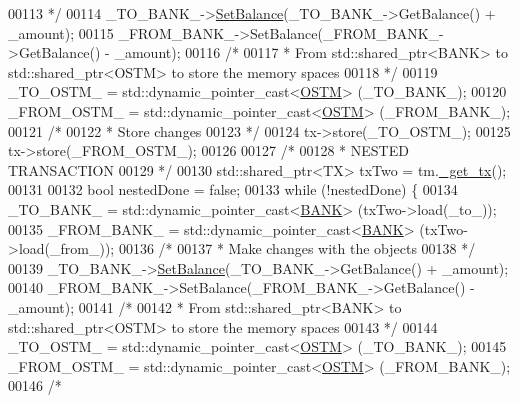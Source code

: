 \begin{DoxyCode}
00113 \textcolor{comment}{             */}
00114             \_TO\_BANK\_->\hyperlink{class_b_a_n_k_ae3e45b407bf8ec7175662442ea24b7c0_ae3e45b407bf8ec7175662442ea24b7c0}{SetBalance}(\_TO\_BANK\_->GetBalance() + \_amount);
00115             \_FROM\_BANK\_->SetBalance(\_FROM\_BANK\_->GetBalance() - \_amount);
00116             \textcolor{comment}{/*}
00117 \textcolor{comment}{             * From std::shared\_ptr<BANK> to std::shared\_ptr<OSTM> to store the memory spaces}
00118 \textcolor{comment}{             */}
00119             \_TO\_OSTM\_ = std::dynamic\_pointer\_cast<\hyperlink{class_o_s_t_m}{OSTM}> (\_TO\_BANK\_);
00120             \_FROM\_OSTM\_ = std::dynamic\_pointer\_cast<\hyperlink{class_o_s_t_m}{OSTM}> (\_FROM\_BANK\_);
00121             \textcolor{comment}{/*}
00122 \textcolor{comment}{             * Store changes}
00123 \textcolor{comment}{             */}
00124             tx->store(\_TO\_OSTM\_);
00125             tx->store(\_FROM\_OSTM\_);
00126 
00127             \textcolor{comment}{/*}
00128 \textcolor{comment}{             * NESTED TRANSACTION}
00129 \textcolor{comment}{             */}
00130             std::shared\_ptr<TX> txTwo = tm.\hyperlink{class_t_m_a41cb0226cc4080c931651b13f74a0075_a41cb0226cc4080c931651b13f74a0075}{\_get\_tx}();
00131 
00132             \textcolor{keywordtype}{bool} nestedDone = \textcolor{keyword}{false};
00133             \textcolor{keywordflow}{while} (!nestedDone) \{
00134                 \_TO\_BANK\_ = std::dynamic\_pointer\_cast<\hyperlink{class_b_a_n_k}{BANK}> (txTwo->load(\_to\_));
00135                 \_FROM\_BANK\_ = std::dynamic\_pointer\_cast<\hyperlink{class_b_a_n_k}{BANK}> (txTwo->load(\_from\_));
00136                 \textcolor{comment}{/*}
00137 \textcolor{comment}{                 * Make changes with the objects}
00138 \textcolor{comment}{                 */}
00139                 \_TO\_BANK\_->\hyperlink{class_b_a_n_k_ae3e45b407bf8ec7175662442ea24b7c0_ae3e45b407bf8ec7175662442ea24b7c0}{SetBalance}(\_TO\_BANK\_->GetBalance() + \_amount);
00140                 \_FROM\_BANK\_->SetBalance(\_FROM\_BANK\_->GetBalance() - \_amount);
00141                 \textcolor{comment}{/*}
00142 \textcolor{comment}{                 * From std::shared\_ptr<BANK> to std::shared\_ptr<OSTM> to store the memory spaces}
00143 \textcolor{comment}{                 */}
00144                 \_TO\_OSTM\_ = std::dynamic\_pointer\_cast<\hyperlink{class_o_s_t_m}{OSTM}> (\_TO\_BANK\_);
00145                 \_FROM\_OSTM\_ = std::dynamic\_pointer\_cast<\hyperlink{class_o_s_t_m}{OSTM}> (\_FROM\_BANK\_);
00146                 \textcolor{comment}{/*}

\end{DoxyCode}
